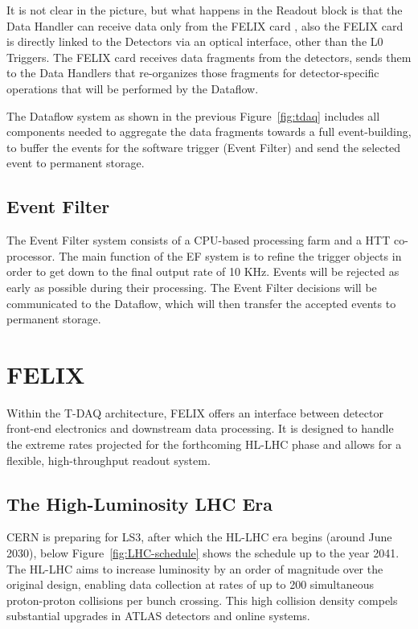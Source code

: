It is not clear in the picture, but what happens in the Readout block is that the Data Handler can receive data only from the \acs{FELIX} card \cite{tdaq}, also the \acs{FELIX} card is directly linked to the Detectors via an optical interface, other than the \acs{L0} Triggers. The \acs{FELIX} card receives data fragments from the detectors, sends them to the Data Handlers that re-organizes those fragments for detector-specific operations that will be performed by the Dataflow.

The Dataflow system \cite{tdaq} as shown in the previous Figure~\ref{fig:tdaq} includes all components needed to aggregate the data fragments towards a full event-building, to buffer the events for the software trigger (Event Filter) and send the selected event to permanent storage.

\subsection{Event Filter}

The Event Filter system \cite{tdaq} consists of a CPU-based processing farm and a \acf{HTT} \cite{htt} co-processor. The main function of the EF system is to refine the trigger objects in order to get down to the final
output rate of 10 KHz. Events will be rejected as early as possible during their processing. The Event Filter decisions will be communicated to the Dataflow, which will then transfer the accepted events to permanent storage.

\clearpage
\section{\acs{FELIX}}

Within the \acs{T-DAQ} architecture, \acs{FELIX} offers an interface between detector front-end electronics and downstream data processing. It is designed to handle the extreme rates projected for the forthcoming HL-LHC phase and allows for a flexible, high-throughput readout system.

\subsection{The High-Luminosity \acs{LHC} Era}

\ac{CERN} is preparing for \acf{LS3}, after which the \acs{HL-LHC} era begins (around June 2030), below Figure~\ref{fig:LHC-schedule} shows the schedule up to the year 2041. The \acf{HL-LHC} aims to increase luminosity by an order of magnitude over the original design, enabling data collection at rates of up to 200 simultaneous proton-proton collisions per bunch crossing. This high collision density compels substantial upgrades in \acs{ATLAS} detectors and online systems.

